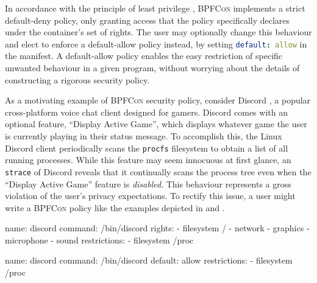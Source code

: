 \documentclass[dvipsnames, 12pt]{article}
\def\bpfcon{\textsc{BPFCon}}
\begin{document}
In accordance with the principle of least privilege
\cite{saltzer1975_protection}, \bpfcon{} implements a strict default-deny
policy, only granting access that the policy specifically declares under the
container's set of rights. The user may optionally change this behaviour and
elect to enforce a default-allow policy instead, by setting
\lstinline[language=yaml]{default: allow} in the manifest. A default-allow
policy enables the easy restriction of specific unwanted behaviour in a given
program, without worrying about the details of constructing a rigorous security
policy.

As a motivating example of \bpfcon{} security policy, consider Discord
\cite{discord}, a popular cross-platform voice chat client designed for gamers.
Discord comes with an optional feature, \enquote{Display Active Game}, which
displays whatever game the user is currently playing in their status message. To
accomplish this, the Linux Discord client periodically scans the \texttt{procfs}
filesystem to obtain a list of all running processes. While this feature may
seem innocuous at first glance, an \texttt{strace} \cite{strace} of Discord
reveals that it continually scans the process tree even when the
\enquote{Display Active Game} feature is \textit{disabled}. This behaviour
represents a gross violation of the user's privacy expectations. To rectify this
issue, a user might write a \bpfcon{} policy like the examples depicted in
 and .

\begin{listing}[
  language=yaml,
  caption={
    A sample manifest for Discord \cite{discord} using \bpfcon{}'s more restrictive
    default-deny confinement. All accesses which are not listed under the
    container's rights are implictly denied. The explicit restriction on
    access to \texttt{procfs} overrides the access right on the root
    filesystem.
  },
  label={lst:discord_a},
  gobble=2]
  name: discord
  command: /bin/discord
  rights:
    - filesystem /
    - network
    - graphics
    - microphone
    - sound
  restrictions:
    - filesystem /proc
\end{listing}

\begin{listing}[
  language=yaml,
  caption={
    A sample manifest for Discord \cite{discord} using \bpfcon{}'s optional
    default-allow confinement.  This permits a much simpler policy that directly
    targets Discord's \texttt{procfs} scanning behaviour.
  },
  label={lst:discord_b},
  gobble=2]
  name: discord
  command: /bin/discord
  default: allow
  restrictions:
    - filesystem /proc
\end{listing}
\end{document}
